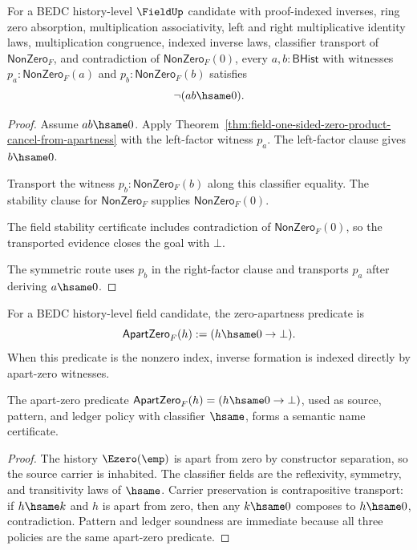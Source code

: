 \begin{theorem}
\label{thm:field-nonzero-factors-exclude-zero-product}
For a BEDC history-level $\FieldUp$ candidate with proof-indexed inverses,
ring zero absorption, multiplication associativity, left and right
multiplicative identity laws, multiplication congruence, indexed inverse
laws, classifier transport of $\mathsf{NonZero}_F$, and contradiction of
$\mathsf{NonZero}_F(0)$, every $a,b:\mathsf{BHist}$ with witnesses
$p_a:\mathsf{NonZero}_F(a)$ and $p_b:\mathsf{NonZero}_F(b)$ satisfies
$$
\neg(a b\hsame0).
$$
\end{theorem}
\begin{proof}
Assume $a b\hsame0$. Apply
Theorem~\ref{thm:field-one-sided-zero-product-cancel-from-apartness} with the
left-factor witness $p_a$. The left-factor clause gives $b\hsame0$.

Transport the witness $p_b:\mathsf{NonZero}_F(b)$ along this classifier
equality. The stability clause for $\mathsf{NonZero}_F$ supplies
$\mathsf{NonZero}_F(0)$.

The field stability certificate includes contradiction of
$\mathsf{NonZero}_F(0)$, so the transported evidence closes the goal with
$\bot$.

The symmetric route uses $p_b$ in the right-factor clause and transports
$p_a$ after deriving $a\hsame0$.
\end{proof}

\begin{definition}
\label{def:field-zero-apartness}
For a BEDC history-level field candidate, the zero-apartness predicate is
$$
\mathsf{ApartZero}_F(h) := (h\hsame0\to\bot).
$$
When this predicate is the nonzero index, inverse formation is indexed
directly by apart-zero witnesses.
\end{definition}

\begin{theorem}
\label{thm:field-apart-zero-semantic-namecert}
The apart-zero predicate $\mathsf{ApartZero}_F(h)=(h\hsame0\to\bot)$, used as
source, pattern, and ledger policy with classifier $\hsame$, forms a semantic
name certificate.
\end{theorem}
\begin{proof}
The history $\Ezero(\emp)$ is apart from zero by constructor separation, so the
source carrier is inhabited. The classifier fields are the reflexivity,
symmetry, and transitivity laws of $\hsame$. Carrier preservation is
contrapositive transport: if $h\hsame k$ and $h$ is apart from zero, then any
$k\hsame0$ composes to $h\hsame0$, contradiction. Pattern and ledger soundness
are immediate because all three policies are the same apart-zero predicate.
\end{proof}

